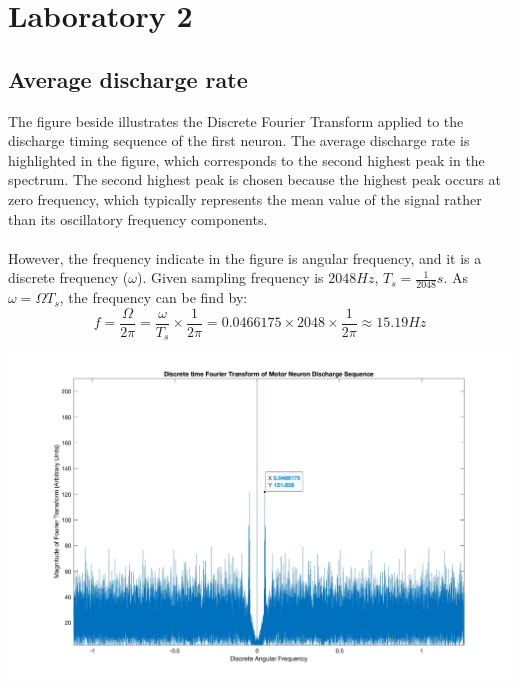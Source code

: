 \documentclass[8pt]{article}  %
\theoremstyle{plain}
\theoremstyle{definition}
\theoremstyle{remark}
\begin{document}
    \newpage
    \section{Laboratory 2}
    \subsection{Average discharge rate}
    \begin{minipage}{0.4\textwidth}
    The figure beside illustrates the Discrete Fourier Transform applied to the discharge timing sequence of the first neuron. 
    The average discharge rate is highlighted in the figure, which corresponds to the second highest peak in the spectrum. 
    The second highest peak is chosen because the highest peak occurs at zero frequency, 
    which typically represents the mean value of the signal rather than its oscillatory frequency components.\\
    \\
    However, the frequency indicate in the figure is angular frequency, and it is a discrete frequency ($\omega$).
    Given sampling frequency is $2048Hz$, $T_s = \frac{1}{2048}s$. As $\omega = \Omega T_s$, the frequency can be find by:\\
    \[f = \frac{\Omega}{2 \pi} = \frac{\omega}{T_s} \times \frac{1}{2 \pi} = 0.0466175 \times 2048 \times \frac{1}{2 \pi} \approx 15.19 Hz\]
    \end{minipage}
    \hfill
    {\begin{minipage}{0.5\textwidth}
    \centering
    \includegraphics[width=\linewidth]{figure/figure_3.jpg}
    \end{minipage}}
\end{document}
